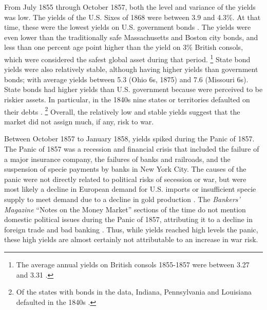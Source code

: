 From July 1855 through October 1857, both the level and variance of the yields was low.
The yields of the U.S. Sixes of 1868 were between 3.9 and 4.3\%.
At that time, these were the lowest yields on U.S. government bonds \parencite[282-283]{HomerSylla2005}.
The yields were even lower than the traditionally safe Massachusetts and Boston city bonds, and less than one percent age point higher than the yield on 3\% British consols, which were considered the safest global asset during that period.%
\footnote{The average annual yields on British consols 1855-1857 were between 3.27 and 3.31 \parencite[193]{HomerSylla2005}.}
State bond yields were also relatively stable, although having higher yields than government bonds; with average yields between 5.3 (Ohio 6s, 1875) and 7.6 (Missouri 6s).
State bonds had higher yields than U.S. government because were perceived to be riskier assets.
In particular, in the 1840s nine states or territories defaulted on their debts \parencite{English1996}.%
\footnote{Of the states with bonds in the data, Indiana, Pennsylvania and Louisiana defaulted in the 1840s \parencite[265]{English1996}.}
Overall, the relatively low and stable yields suggest that the market did not assign much, if any, risk to war.

Between October 1857 to January 1858, yields spiked during the Panic of 1857.
The Panic of 1857 was a recession and financial crisis that included the failure of a major insurance company, the failures of banks and railroads, and the suspension of specie payments by banks in New York City.
The causes of the panic were not directly related to political risks of secession or war, but were most likely a decline in European demand for U.S. imports or insufficient specie supply to meet demand due to a decline in gold production \parencites[263-265]{Dewey1918}[277,299]{HomerSylla2005}[337]{BankersMagazine1857}.
The \textit{Bankers' Magazine} ``Notes on the Money Market'' sections of the time do not mention domestic political issues during the Panic of 1857, attributing it to a decline in foreign trade and bad banking \parencite[337]{BankersMagazine1857}.
Thus, while yields reached high levels the panic, these high yields are almost certainly not attributable to an increase in war risk.

